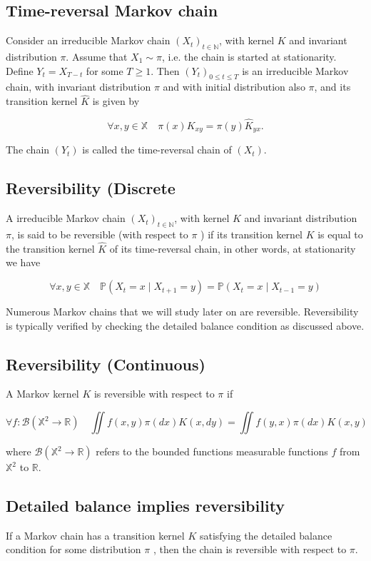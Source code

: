 \documentclass[10pt]{article}
\begin{document}
\subsection{Time-reversal Markov chain}
Consider an irreducible Markov chain $\left(X_{t}\right)_{t \in \mathbb{N}}$, with kernel $K$ and invariant distribution $\pi$. Assume that $X_{1} \sim \pi$, i.e. the chain is started at stationarity. Define $Y_{t}=X_{T-t}$ for some $T \geq 1$. Then $\left(Y_{t}\right)_{0 \leq t \leq T}$ is an irreducible Markov chain, with invariant distribution $\pi$ and with initial distribution also $\pi$, and its transition kernel $\hat{K}$ is given by

$$
\forall x, y \in \mathbb{X} \quad \pi(x) K_{x y}=\pi(y) \hat{K}_{y x} .
$$

The chain $\left(Y_{t}\right)$ is called the time-reversal chain of $\left(X_{t}\right)$.

\subsection{Reversibility (Discrete}
A irreducible Markov chain $\left(X_{t}\right)_{t \in \mathbb{N}}$, with kernel $K$ and invariant distribution $\pi$, is said to be reversible (with respect to $\pi$ ) if its transition kernel $K$ is equal to the transition kernel $\hat{K}$ of its time-reversal chain, in other words, at stationarity we have

$$
\forall x, y \in \mathbb{X} \quad \mathbb{P}\left(X_{t}=x \mid X_{t+1}=y\right)=\mathbb{P}\left(X_{t}=x \mid X_{t-1}=y\right)
$$

Numerous Markov chains that we will study later on are reversible. Reversibility is typically verified by checking the detailed balance condition as discussed above.

\subsection{Reversibility (Continuous)}
A Markov kernel $K$ is reversible with respect to $\pi$ if

$$
\forall f: \mathcal{B}\left(\mathbb{X}^{2} \rightarrow \mathbb{R}\right) \quad \iint f(x, y) \pi(d x) K(x, d y)=\iint f(y, x) \pi(d x) K(x, y)
$$

where $\mathcal{B}\left(\mathbb{X}^{2} \rightarrow \mathbb{R}\right)$ refers to the bounded functions measurable functions $f$ from $\mathbb{X}^{2}$ to $\mathbb{R}$.


\subsection{Detailed balance implies reversibility}
If a Markov chain has a transition kernel $K$ satisfying the detailed balance condition for some distribution $\pi$ , then the chain is reversible with respect to $\pi$.
\end{document}
